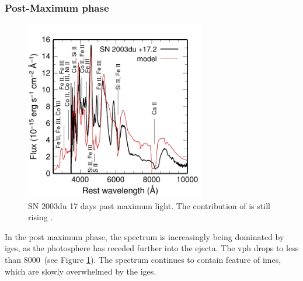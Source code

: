 \subsubsection{Post-Maximum phase}
\begin{figure}[t!] %
   \centering
   \includegraphics[width=0.7\textwidth]{chapter_intro/plots/2003du_p17.pdf}
   \caption{SN 2003du 17 days past maximum light. The contribution of  is still rising \citep[Figure kindly provided by M. Tanaka;][]{2011MNRAS.410.1725T}.}
   \label{fig:sn2003du_postmax}
\end{figure}
In the post maximum phase, the spectrum is increasingly being dominated by \glspl{ige}, as the photosphere has receded further into the ejecta. The \gls{vph} drops to less than 8000~\kms (see Figure \ref{fig:sn2003du_postmax}). The spectrum continues to contain feature of \glspl{ime}, which are slowly overwhelmed by the \glspl{ige}.






